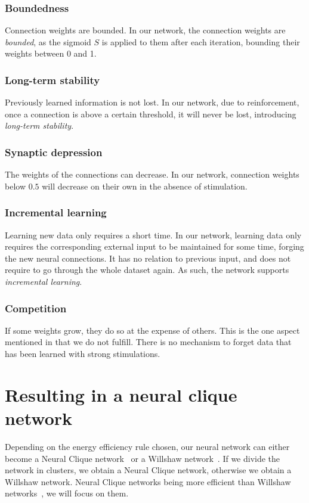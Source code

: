 \documentclass[journal]{IEEEtran}
\begin{document}
\subsubsection{Boundedness} Connection weights are bounded. In our network, the connection weights are \emph{bounded}, as the sigmoid $S$ is applied to them after each iteration, bounding their weights between 0 and 1.
\subsubsection{Long-term stability} Previously learned information is not
lost. In our network, due to reinforcement, once a connection is above a certain threshold, it will never be lost, introducing \emph{long-term stability}.
\subsubsection{Synaptic depression} The weights of the connections can
decrease. In our network, connection weights below $0.5$ will decrease on their own in the absence of stimulation.
\subsubsection{Incremental learning} Learning new data only requires a
short time. In our network, learning data only requires the corresponding external input to be maintained for some time, forging the new neural connections. It has no relation to previous input, and does not require to go through the whole dataset again. As such, the network supports \emph{incremental learning}.
\subsubsection{Competition} If some weights grow, they do so at the expense of others. This is the one aspect mentioned in \cite{gerstner2002mathematical} that we do not fulfill. There is no mechanism to forget data that has been learned with strong stimulations.


\section{Resulting in a neural clique network}

Depending on the energy efficiency rule chosen, our neural network can either become a Neural Clique network~\cite{gripon2011sparse} or a Willshaw network~\cite{willshaw1969non}. If we divide the network in clusters, we obtain a Neural Clique network, otherwise we obtain a Willshaw network. Neural Clique networks being more efficient than Willshaw networks~\cite{gripon2015comparative}, we will focus on them. 
\end{document}
